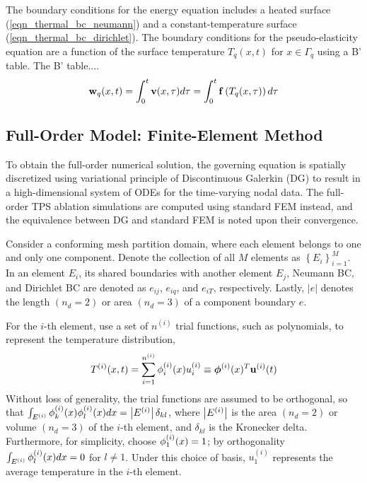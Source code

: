 The boundary conditions for the energy equation includes a heated surface (\cref{eqn_thermal_bc_neumann}) and a constant-temperature surface (\cref{eqn_thermal_bc_dirichlet}). The boundary conditions for the pseudo-elasticity equation are a function of the surface temperature $T_q(x,t)$ for $x\in\Gamma_q$ using a B' table. The B' table....
\begin{equation}
    \mathbf{w}_q(x,t) = \int_{0}^{t} \mathbf{v}(x,\tau)d\tau = \int_{0}^{t}\mathbf{f}\left(T_q(x,\tau)\right)d\tau\label{eqn_boundary_displacement}
\end{equation}


\subsection{Full-Order Model: Finite-Element Method}\label{sec_fom}

To obtain the full-order numerical solution, the governing equation is spatially discretized using variational principle of Discontinuous Galerkin (DG) to result in a high-dimensional system of ODEs for the time-varying nodal data. The full-order TPS ablation simulations are computed using standard FEM instead, and the equivalence between DG and standard FEM is noted upon their convergence.

Consider a conforming mesh partition domain, where each element belongs to one and only one component. Denote the collection of all $M$ elements as $\left\{E_i\right\}_{i=1}^{M}$. In an element $E_i$, its shared boundaries with another element $E_j$, Neumann BC, and Dirichlet BC are denoted as $e_{ij}$, $e_{iq}$, and $e_{iT}$, respectively. Lastly, $\left|e\right|$ denotes the length $(n_d=2)$ or area $(n_d=3)$ of a component boundary $e$.

For the $i$-th element, use a set of $n^{(i)}$ trial functions, such as polynomials, to represent the temperature distribution,
\begin{equation}
    T^{(i)}(x,t) = \sum_{i=1}^{n^{(i)}} \phi_i^{(i)}(x)u_i^{(i)} \equiv \boldsymbol{\phi}^{(i)}(x)^T\mathbf{u}^{(i)}(t)
\end{equation}
Without loss of generality, the trial functions are assumed to be orthogonal, so that $\int_{E^{(i)}} \phi^{(i)}_k(x) \phi^{(i)}_l(x) dx = \left|E^{(i)}\right|\delta_{kl}$, where $\left|E^{(i)}\right|$ is the area $(n_d=2)$ or volume $(n_d=3)$ of the $i$-th element, and $\delta_{kl}$ is the Kronecker delta. Furthermore, for simplicity, choose $\phi^{(i)}_1(x) = 1$; by orthogonality $\int_{E^{(i)}} \phi^{(i)}_l(x) dx = 0$ for $l \neq 1$. Under this choice of basis, $u_1^{(i)}$ represents the average temperature in the $i$-th element.


